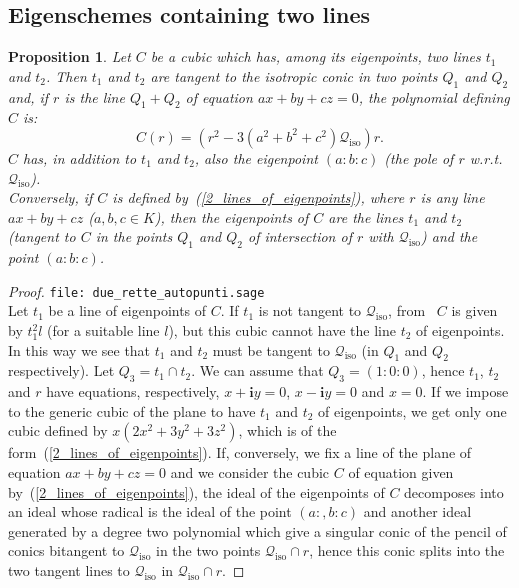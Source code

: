\documentclass{amsart}
\theoremstyle{plain}
\newtheorem{prop}[lemma]{Proposition}
\theoremstyle{definition}
\newcommand{\iso}{\mathcal{Q}_{\mathrm{iso}}}
\newcommand{\iii}{\textbf{i}}
\begin{document}
\subsection{Eigenschemes containing two lines}
\begin{prop}
\label{cubiche_con_2_rette}
Let $C$ be a cubic which has, among its eigenpoints, two lines $t_1$
and $t_2$. Then $t_1$ and $t_2$ are tangent to the isotropic conic
in two points $Q_1$ and $Q_2$ and, if $r$ is the line $Q_1+Q_2$
of equation $ax+by+cz=0$, the polynomial defining $C$ is:
\begin{equation}
C(r) = \left(r^2-3\left(a^2+b^2+c^2\right)\iso\right)r.
\label{2_lines_of_eigenpoints}
\end{equation}
$C$ has, in addition to $t_1$ and $t_2$, also the eigenpoint $(a: b: c)$
(the pole of $r$ w.r.t.\ $\iso$). \\
Conversely, if $C$ is defined by~(\ref{2_lines_of_eigenpoints}), where
$r$ is any line $ax+by+cz$ ($a, b, c \in K$), then
the eigenpoints of $C$ are the lines $t_1$ and $t_2$ (tangent to $C$
in the points $Q_1$ and $Q_2$ of intersection of $r$ with $\iso$) and
the point $(a: b: c)$.
\end{prop}
\begin{proof}
\verb+file: due_rette_autopunti.sage+\\
Let $t_1$ be a line of eigenpoints of $C$. If $t_1$ is not tangent
to $\iso$, from~ $C$ is given by $t_1^2l$ (for
a suitable line $l$), but this cubic cannot have the line $t_2$
of eigenpoints.
In this way we see that $t_1$ and $t_2$ must be tangent to $\iso$ (in
$Q_1$ and $Q_2$ respectively). Let $Q_3 = t_1 \cap t_2$. We can assume
that $Q_3 = (1: 0: 0)$, hence $t_1$, $t_2$ and $r$ have equations,
respectively, $x+\iii y=0$, $x-\iii y = 0$ and  $x=0$.
If we impose to the generic cubic of the plane to have
$t_1$ and $t_2$ of eigenpoints, we get only one cubic defined by
$x(2x^2 + 3y^2 + 3z^2)$, which is of the
form~(\ref{2_lines_of_eigenpoints}). If, conversely, we fix a line
of the plane of equation $ax+by+cz=0$ and we consider the cubic $C$ of
equation given by~(\ref{2_lines_of_eigenpoints}), the ideal of
the eigenpoints of $C$ decomposes into an ideal whose radical is
the ideal of the point $(a:, b: c)$ and another ideal generated by
a degree two polynomial which give a singular conic of the pencil
of conics bitangent to $\iso$ in the two points $\iso \cap r$, hence
this conic splits into the two tangent lines to $\iso$ in $\iso \cap r$.
\end{proof}
\end{document}
